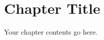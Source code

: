 \documentclass[../../main.tex]{subfiles}
\begin{document}
\chapter{Chapter Title}

Your chapter contents go here. 

\end{document}
